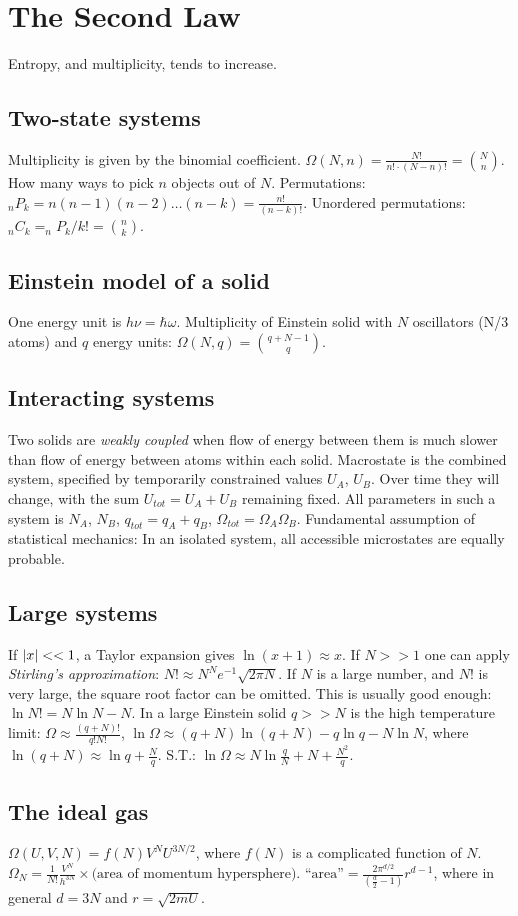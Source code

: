 \documentclass[11pt,twocolumn]{amsart}
\begin{document}
\section{The Second Law}
Entropy, and multiplicity, tends to increase.
\subsection{Two-state systems} 
Multiplicity is given by the binomial coefficient. $\Omega(N,n) = \frac{N!}{n!\cdot (N-n)! } = \binom{N}{n}$. How many ways to pick $n$ objects out of $N$. Permutations: $_nP_k = n(n-1)(n-2)\dots (n-k) = \frac{n!}{(n-k)!} $. Unordered permutations: $_nC_k = _nP_k / k! = \binom{n}{k}$.
\subsection{Einstein model of a solid} 
One energy unit is $h\nu = \hbar\omega$. Multiplicity of Einstein solid with $N$ oscillators (N/3 atoms) and $q$ energy units: $\Omega(N,q) = \binom{q+N-1}{q}$.
\subsection{Interacting systems}
Two solids are \emph{weakly coupled} when flow of energy between them is much slower than flow of energy between atoms within each solid. Macrostate is the combined system, specified by temporarily constrained values $U_A$, $U_B$. Over time they will change, with the sum $U_{tot} = U_A + U_B$ remaining fixed. All parameters in such a system is $N_A$, $N_B$, $q_{tot}=q_A+q_B$, $\Omega_{tot}=\Omega_A \Omega_B$. Fundamental assumption of statistical mechanics: In an isolated system, all accessible microstates are equally probable.
\subsection{Large systems}
If $\abs{x} << 1$, a Taylor expansion gives $\ln(x+1)\approx x$. If $N >> 1$ one can apply \emph{Stirling's approximation}: $N! \approx N^Ne^{-1}\sqrt{2\pi N}$. If $N$ is a large number, and $N!$ is very large, the square root factor can be omitted. This is usually good enough: $\ln N! = N\ln N - N$. In a large Einstein solid $q>>N$ is the high temperature limit: $\Omega \approx \frac{(q+N)!}{q!N!}$, $\ln\Omega \approx (q+N)\ln(q+N) - q\ln q - N\ln N$, where $\ln(q+N) \approx \ln q + \frac{N}{q}$. S.T.: $\ln\Omega \approx N\ln \frac{q}{N} + N + \frac{N^2}{q}$.
\subsection{The ideal gas}
$\Omega(U,V,N) = f(N)V^NU^{3N/2}$, where $f(N)$ is a complicated function of $N$. $\Omega_N = \frac{1}{N!}\frac{V^N}{h^{3N}}\times\text{(area of momentum hypersphere)}$. $\text{``area''} = \frac{2\pi^{d/2}}{(\frac{d}{2}-1)}r^{d-1}$, where  in general $d=3N$ and $r = \sqrt{2mU}$.
\end{document}
